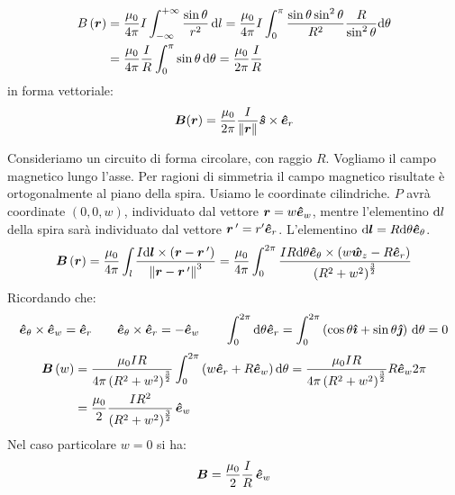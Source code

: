 \begin{align*}
  B\left(\boldsymbol{r}\right) & =\frac{\mu_0}{4\pi}I\int_{-\infty}^{+\infty}\frac{\sin\theta}{r^2}\,\mathrm{d} l=\frac{\mu_0}{4\pi}I\int_{0}^{\pi}\frac{\sin\theta\sin^2\theta}{R^2}\frac{R}{\sin^2\theta}\mathrm{d}\theta \\
                      & =\frac{\mu_0}{4\pi}\frac{I}{R}\int_0^\pi\sin\theta\,\mathrm{d}\theta=\frac{\mu_0}{2\pi}\frac{I}{R}
\end{align*}
in forma vettoriale:
\begin{equation}
  \boldsymbol{B}(\boldsymbol{r})=\frac{\mu_0}{2\pi}\frac{I}{\left\lVert\boldsymbol{r}\right\rVert}\boldsymbol{\hat {s}}\times{\boldsymbol{\hat {e}}_r}
\end{equation}
\begin{Es}
  Consideriamo un circuito di forma circolare, con raggio $R$. Vogliamo il campo magnetico lungo l'asse. Per ragioni di simmetria il campo magnetico risultate è ortogonalmente al piano della spira. Usiamo le coordinate cilindriche. $P$ avrà coordinate $(0,0,w)$, individuato dal vettore $\boldsymbol{r}=w \boldsymbol{\hat {e}}_w$, mentre l'elementino $\mathrm{d} l$ della spira sarà individuato dal vettore $\boldsymbol{r}\,'=r'\boldsymbol{\hat {e}}_r$. L'elementino $\mathrm{d}\boldsymbol{l}=R\mathrm{d}\theta\boldsymbol{\hat {e}}_\theta$.
  \[\boldsymbol{B}\left(\boldsymbol{r}\right)=\frac{\mu_0}{4\pi}\int_l\frac{I\mathrm{d}\boldsymbol{l}\times\left(\boldsymbol{r}-\boldsymbol{r}\,'\right)}{\left\lVert\boldsymbol{r}-\boldsymbol{r}\,'\right\rVert^3}=\frac{\mu_0}{4\pi}\int_0^{2\pi}\frac{IR\mathrm{d}\theta\boldsymbol{\hat {e}}_\theta\times\left(w\boldsymbol{\hat {w}}_z-R\boldsymbol{\hat {e}}_r\right)}{\left(R^2+w^2\right)^{\frac{3}{2}}}\]
  Ricordando che:
  \[\boldsymbol{\hat {e}}_\theta\times\boldsymbol{\hat {e}}_w=\boldsymbol{\hat {e}}_r\qquad \boldsymbol{\hat {e}}_\theta\times\boldsymbol{\hat {e}}_r=-\boldsymbol{\hat {e}}_w\qquad \int_0^{2\pi} \mathrm{d}\theta\boldsymbol{\hat {e}}_r=\int_0^{2\pi}\left(\cos\theta\boldsymbol{\hat {\imath}}+\sin\theta\boldsymbol{\hat {\jmath}}\right)\,\mathrm{d} \theta=0\]
  \begin{equation}
    \label{eq:b_spira}
    \begin{aligned}
      \boldsymbol{B}\left(w\right) & =\frac{\mu_0IR}{4\pi\left(R^2+w^2\right)^{\frac{3}{2}}}\int_0^{2\pi}\left(w\boldsymbol{\hat {e}}_r+R\boldsymbol{\hat {e}}_w\right)\mathrm{d}\theta=\frac{\mu_0IR}{4\pi\left(R^2+w^2\right)^{\frac{3}{2}}}R\boldsymbol{\hat {e}}_w 2\pi \\
                          & =\frac{\mu_0}{2}\frac{IR^2}{\left(R^2+w^2\right)^{\frac{3}{2}}}\,\boldsymbol{\hat {e}}_w
    \end{aligned}
  \end{equation}
  Nel caso particolare $w=0$ si ha:
  \[\boldsymbol{B}=\frac{\mu_0}{2}\frac{I}{R}\,\boldsymbol{\hat {e}}_w\]
\end{Es}
